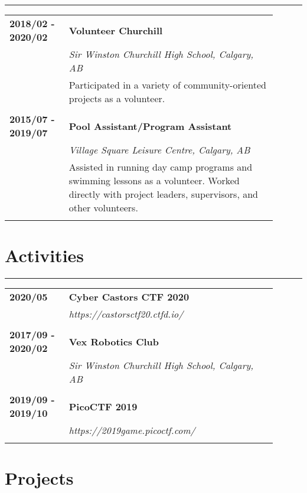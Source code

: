 \documentclass[letterpaper]{article}
\newcommand{\horizontalLine}{%
    \rule{\linewidth}{0.2pt}
    \vspace{1ex}
}
\begin{document}
        \horizontalLine

        \begin{tabular}{p{0.2\linewidth} p{0.7\linewidth}} 
            \textbf{2018/02 - 2020/02} & \large\textbf{Volunteer Churchill} \\
            & \emph{Sir Winston Churchill High School, Calgary, AB} \\
            & Participated in a variety of community-oriented projects as a volunteer. \\
            \\
            \textbf{2015/07 - 2019/07} & \large\textbf{Pool Assistant/Program Assistant} \\
            & \emph{Village Square Leisure Centre, Calgary, AB} \\
            & Assisted in running day camp programs and swimming lessons as a volunteer.
            Worked directly with project leaders, supervisors, and other volunteers. \\
            \\
        \end{tabular}

    \section*{Activities}

        \horizontalLine

        \begin{tabular}{p{0.2\linewidth} p{0.7\linewidth}} 
            \textbf{2020/05} & \large\textbf{Cyber Castors CTF 2020} \\
            & \emph{https://castorsctf20.ctfd.io/} \\
            \\
            \textbf{2017/09 - 2020/02} & \large\textbf{Vex Robotics Club} \\
            & \emph{Sir Winston Churchill High School, Calgary, AB} \\
            \\
            \textbf{2019/09 - 2019/10} & \large\textbf{PicoCTF 2019} \\
            & \emph{https://2019game.picoctf.com/} \\
            \\
        \end{tabular}

    \section*{Projects}
\end{document}

